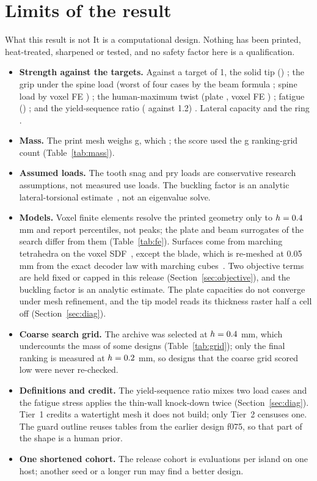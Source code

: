 \section{Limits of the result}\label{sec:limits}
\begin{eibox}{What this result is not}
It is a computational design. Nothing has been printed, heat-treated, sharpened or tested, and no safety factor here is
a qualification.
\end{eibox}
\begin{itemize}
\item \textbf{Strength against the targets.} Against a target of 1, the solid tip (\gTipSF) \gTipReading; the grip under
the spine load (worst of four cases by the beam formula \gGripSF; spine load by voxel FE \gFeGripSpine) \gGripReading; the human-maximum twist (plate \gHmTwist, voxel FE
\gFeRootTwist) \gTwistReading; fatigue (\gFat) \gFatReading; and the yield-sequence ratio (\gSeq{} against 1.2)
\gSeqReading. Lateral capacity \gLatReading{} and the ring \gRingReading.
\item \textbf{Mass.} The print mesh weighs \gMassG{} g, which \gMassReading; the score used the \gMassRankG{} g ranking-grid
count (Table~\ref{tab:mass}).
\item \textbf{Assumed loads.} The tooth snag and pry loads are conservative research assumptions, not measured use loads.
The buckling factor is an analytic lateral-torsional estimate~\cite{timoshenko1961}, not an eigenvalue solve.
\item \textbf{Models.} Voxel finite elements resolve the printed geometry only to $h = 0.4$ mm and report percentiles,
not peaks; the plate and beam surrogates of the search differ from them (Table~\ref{tab:fe}). Surfaces come from marching
tetrahedra on the voxel SDF~\cite{doi1991}, except the blade, which is re-meshed at 0.05 mm from the exact decoder law
with marching cubes~\cite{lorensen1987}. Two objective terms are held fixed or capped in this release
(Section~\ref{sec:objective}), and the buckling factor is an analytic estimate. The plate capacities do not converge
under mesh refinement, and the tip model reads its thickness raster half a cell off (Section~\ref{sec:diag}).
\item \textbf{Coarse search grid.} The archive was selected at $h = 0.4$ mm, which undercounts the mass of some
designs (Table~\ref{tab:grid}); only the final ranking is measured at $h = 0.2$ mm, so designs that the coarse grid
scored low were never re-checked.
\item \textbf{Definitions and credit.} The yield-sequence ratio mixes two load cases and the fatigue stress applies the
thin-wall knock-down twice (Section~\ref{sec:diag}). Tier~1 credits a watertight mesh it does not build; only Tier~2
censuses one. The guard outline reuses tables from the earlier design f075, so that part of the shape is a human prior.
\item \textbf{One shortened cohort.} The release cohort is \gEvalsIsland{} evaluations per island on one host; another
seed or a longer run may find a better design.
\end{itemize}
